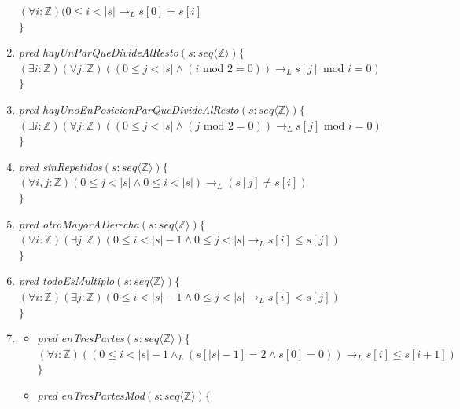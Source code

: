 \documentclass[a4paper]{article}
\begin{document}
\begin{enumerate}[label=\alph*)]
\hspace*{6mm}$(\forall i:\mathbb{Z})(0\leq i<\vert s\vert\rightarrow_L s[0]=s[i]$\\
$\}$
\item \textit{pred hayUnParQueDivideAlResto}$(s: seq\langle \mathbb{Z} \rangle)\{$\\
\hspace*{6mm}$(\exists i:\mathbb{Z})(\forall j:\mathbb{Z})((0\leq j<\vert s\vert \wedge (i \textrm{ mod } 2 =0))\rightarrow_L s[j] \textrm{ mod } i =0)$\\
$\}$
\item \textit{pred hayUnoEnPosicionParQueDivideAlResto}$(s: seq\langle \mathbb{Z} \rangle)\{$\\
\hspace*{6mm}$(\exists i:\mathbb{Z})(\forall j:\mathbb{Z})((0\leq j<\vert s\vert \wedge (j \textrm{ mod } 2 =0))\rightarrow_L s[j] \textrm{ mod } i =0)$\\
$\}$
\item \textit{pred sinRepetidos}$(s: seq\langle \mathbb{Z} \rangle)\{$\\
\hspace*{6mm}$(\forall i,j:\mathbb{Z})(0\leq j<\vert s\vert \wedge 0\leq i<\vert s\vert)\rightarrow_L (s[j] \neq s[i])$\\
$\}$
\item \textit{pred otroMayorADerecha}$(s: seq\langle \mathbb{Z} \rangle)\{$\\
\hspace*{6mm}$(\forall i:\mathbb{Z})(\exists j:\mathbb{Z})(0\leq i<\vert s\vert -1 \wedge 0\leq j<\vert s\vert\rightarrow_L s[i]\leq s[j])$\\
$\}$
\item \textit{pred todoEsMultiplo}$(s: seq\langle \mathbb{Z} \rangle)\{$\\
\hspace*{6mm}$(\forall i:\mathbb{Z})(\exists j:\mathbb{Z})(0\leq i<\vert s\vert -1 \wedge 0\leq j<\vert s\vert\rightarrow_L s[i]< s[j])$\\
$\}$
\item 
\begin{itemize}
\item \textit{pred enTresPartes}$(s: seq\langle \mathbb{Z} \rangle)\{$\\
\hspace*{6mm}$(\forall i:\mathbb{Z})((0\leq i<\vert s\vert -1 \wedge_L (s[\vert s \vert -1]=2 \wedge s[0]=0) )\rightarrow_L s[i]\leq s[i+1])$\\
$\}$
\item \textit{pred enTresPartesMod}$(s: seq\langle \mathbb{Z} \rangle)\{$\\

\end{itemize}
\end{enumerate}
\end{document}
